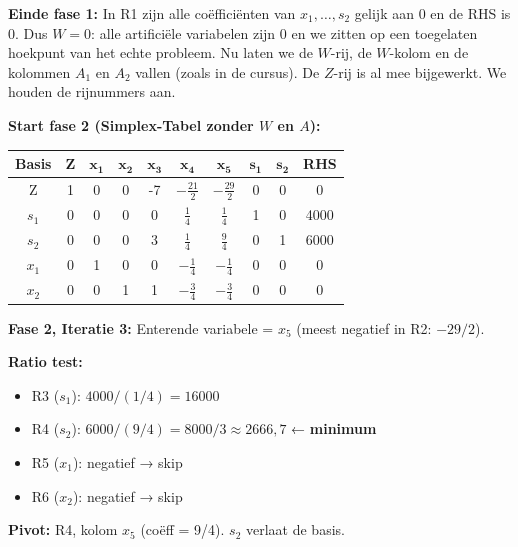 \documentclass[a4paper,11pt]{article}
\begin{document}
\begin{oefenblok}
    \textbf{Einde fase 1:} In R1 zijn alle coëfficiënten van $x_1, \dots, s_2$ gelijk aan 0 en de RHS is 0. Dus $W = 0$: alle artificiële variabelen zijn 0 en we zitten op een toegelaten hoekpunt van het echte probleem. Nu laten we de $W$-rij, de $W$-kolom en de kolommen $A_1$ en $A_2$ vallen (zoals in de cursus). De $Z$-rij is al mee bijgewerkt. We houden de rijnummers aan.


    \textbf{Start fase 2 (Simplex-Tabel zonder $W$ en $A$):}

    \begin{center}
        \footnotesize
        \setlength{\tabcolsep}{3pt}
        \begin{tabular}{|c|c|c|c|c|c|c|c|c|c|}
            \hline
            \textbf{Basis} & \textbf{Z} & $\mathbf{x_1}$ & $\mathbf{x_2}$ & $\mathbf{x_3}$ & $\mathbf{x_4}$ & $\mathbf{x_5}$ & $\mathbf{s_1}$ & $\mathbf{s_2}$ & \textbf{RHS} \\
            \hline
            Z & 1 & 0 & 0 & -7 & $-\frac{21}{2}$ & $-\frac{29}{2}$ & 0 & 0 & 0 \\
            \hline
            $s_1$ & 0 & 0 & 0 & 0 & $\frac{1}{4}$ & $\frac{1}{4}$ & 1 & 0 & 4000 \\
            \hline
            $s_2$ & 0 & 0 & 0 & 3 & $\frac{1}{4}$ & $\frac{9}{4}$ & 0 & 1 & 6000 \\
            \hline
            $x_1$ & 0 & 1 & 0 & 0 & $-\frac{1}{4}$ & $-\frac{1}{4}$ & 0 & 0 & 0 \\
            \hline
            $x_2$ & 0 & 0 & 1 & 1 & $-\frac{3}{4}$ & $-\frac{3}{4}$ & 0 & 0 & 0 \\
            \hline
        \end{tabular}
    \end{center}

    \textbf{Fase 2, Iteratie 3:} Enterende variabele = $x_5$ (meest negatief in R2: $-29/2$).

    \textbf{Ratio test:}
    \begin{itemize}
        \item R3 ($s_1$): $4000/(1/4) = 16000$
        \item R4 ($s_2$): $6000/(9/4) = 8000/3 \approx 2666{,}7$ ← \textbf{minimum}
        \item R5 ($x_1$): negatief → skip
        \item R6 ($x_2$): negatief → skip
    \end{itemize}

    \textbf{Pivot:} R4, kolom $x_5$ (coëff = 9/4). $s_2$ verlaat de basis.


\end{oefenblok}
\end{document}
